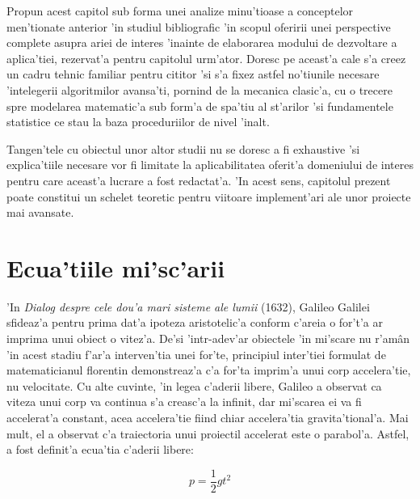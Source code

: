 \documentclass[12pt,a4paper,twoside]{report}
\begin{document}


Propun acest capitol sub forma unei analize minu'tioase a conceptelor men'tionate anterior 'in studiul bibliografic 'in scopul oferirii unei perspective complete asupra ariei de interes 'inainte de elaborarea modului de dezvoltare a aplica'tiei, rezervat'a pentru capitolul urm'ator. Doresc pe aceast'a cale s'a creez un cadru tehnic familiar pentru cititor 'si s'a fixez astfel no'tiunile necesare 'intelegerii algoritmilor avansa'ti, pornind de la mecanica clasic'a, cu o trecere spre modelarea matematic'a sub form'a de spa'tiu al st'arilor 'si fundamentele statistice ce stau la baza proceduriilor de nivel 'inalt. 

\vspace{5px}

Tangen'tele cu obiectul unor altor studii nu se doresc a fi exhaustive 'si explica'tiile necesare vor fi limitate la aplicabilitatea oferit'a domeniului de interes pentru care aceast'a lucrare a fost redactat'a. 'In acest sens, capitolul prezent poate constitui un schelet teoretic pentru viitoare implement'ari ale unor proiecte mai avansate.


\section{Ecua'tiile mi'sc'arii}

'In \textit{Dialog despre cele dou'a mari sisteme ale lumii} (1632), Galileo Galilei sfideaz'a pentru prima dat'a ipoteza aristotelic'a conform c'areia o for't'a ar imprima unui obiect o vitez'a. De'si 'intr-adev'ar obiectele 'in mi'scare nu r'am\^{a}n 'in acest stadiu f'ar'a interven'tia unei for'te, principiul inter'tiei formulat de matematicianul florentin demonstreaz'a c'a for'ta imprim'a unui corp accelera'tie, nu velocitate. Cu alte cuvinte, 'in legea c'aderii libere, Galileo a observat ca viteza unui corp va continua s'a creasc'a la infinit, dar mi'scarea ei va fi accelerat'a constant, acea accelera'tie fiind chiar accelera'tia gravita'tional'a. Mai mult, el a observat c'a traiectoria unui proiectil accelerat este o parabol'a. Astfel, a fost definit'a ecua'tia c'aderii libere:

\begin{equation}
 p = \frac{1}{2}gt^2
\end{equation}
\end{document}
